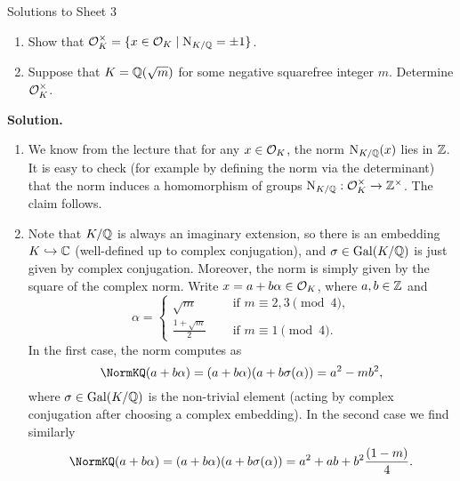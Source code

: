 \documentclass[a4paper,11pt]{article}
\begin{document}
\begin{center}
    \huge{Solutions to Sheet 3}
\end{center}

\begin{enumerate}
    \item Show that $\mathcal{O}_K^\times = \{x \in \mathcal{O}_K \mid \operatorname{N}_{K/\mathbb{Q}} = \pm 1\}$.
    \item Suppose that $K = \mathbb{Q}(\sqrt m)$ for some negative squarefree integer
        $m$. Determine $\mathcal{O}_K^\times$. 
\end{enumerate}

\textbf{Solution.}
\begin{enumerate}
    \item We know from the lecture that for any $x \in \mathcal{O}_K$, the norm
        $\operatorname{N}_{K/\mathbb{Q}}(x)$ lies in $\mathbb{Z}$. It is easy to check (for example by 
        defining the norm via the determinant) that the norm induces a
        homomorphism of groups $\operatorname{N}_{K/\mathbb{Q}}: \mathcal{O}_K^\times \to \mathbb{Z}^\times$.
        The claim follows.
    \item 
        Note that $K/\mathbb{Q}$ is always an imaginary extension, so there is an
        embedding $K \hookrightarrow \mathbb{C}$ (well-defined up to complex conjugation), and
        $\sigma \in \operatorname{Gal}(K/\mathbb{Q})$ is just given by complex conjugation. Moreover,
        the norm is simply given by the square of
        the complex norm.
        Write $x = a + b \alpha \in \mathcal{O}_K$, where $a, b \in \mathbb{Z}$ and 
        \begin{equation*}
            \alpha =    \begin{cases}
                            \sqrt m \quad &\text{ if } m \equiv 2,3 \pmod 4, \\
                            \frac{1+\sqrt m}2 \quad &\text{ if } m \equiv 1 \pmod 4.
                        \end{cases}
        \end{equation*}
        In the first case, the norm computes as
        \begin{equation*}
             \NormKQ (a + b \alpha) = (a + b \alpha)(a + b
            \sigma(\alpha)) =  a^2 - mb^2,
        \end{equation*}
        where $\sigma \in \operatorname{Gal}({K/\mathbb{Q}})$ is the non-trivial element (acting by 
        complex conjugation after choosing a complex embedding).
        In the second case we find similarly
        \begin{equation*}
             \NormKQ (a + b \alpha) = (a + b \alpha)(a + b
            \sigma(\alpha)) =  a^2 + ab + b^2 \frac{(1-m)}4.

\end{equation*}
\end{enumerate}
\end{document}
